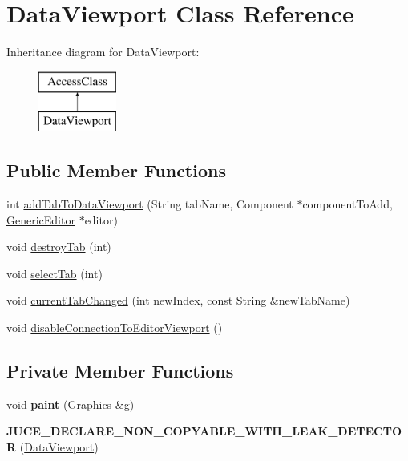 \hypertarget{classDataViewport}{\section{Data\-Viewport Class Reference}
\label{classDataViewport}
}
Inheritance diagram for Data\-Viewport\-:\begin{figure}[H]
\begin{center}
\leavevmode
\includegraphics[height=2.000000cm]{classDataViewport}
\end{center}
\end{figure}
\subsection*{Public Member Functions}
\begin{DoxyCompactItemize}
\item 
int \hyperlink{classDataViewport_accdcf7187ec5864fdbf0c2a3e605b072}{add\-Tab\-To\-Data\-Viewport} (String tab\-Name, Component $\ast$component\-To\-Add, \hyperlink{classGenericEditor}{Generic\-Editor} $\ast$editor)
\item 
void \hyperlink{classDataViewport_ad68668771aa73c3cdcefcfa692fe0098}{destroy\-Tab} (int)
\item 
void \hyperlink{classDataViewport_a03221f79ac5f5edd473221bfc8f42dcc}{select\-Tab} (int)
\item 
void \hyperlink{classDataViewport_a3d468d1c0f59f84165be4b68c0882c8d}{current\-Tab\-Changed} (int new\-Index, const String \&new\-Tab\-Name)
\item 
void \hyperlink{classDataViewport_a6f501d921cd1b2539790624accc6ea00}{disable\-Connection\-To\-Editor\-Viewport} ()
\end{DoxyCompactItemize}
\subsection*{Private Member Functions}
\begin{DoxyCompactItemize}
\item 
\hypertarget{classDataViewport_a0edb05653624ca748aa2fb99be4a92d1}{void {\bfseries paint} (Graphics \&g)}\label{classDataViewport_a0edb05653624ca748aa2fb99be4a92d1}

\item 
\hypertarget{classDataViewport_ade8ef66cda0ef16c1e8bac8acb0bb6f5}{{\bfseries J\-U\-C\-E\-\_\-\-D\-E\-C\-L\-A\-R\-E\-\_\-\-N\-O\-N\-\_\-\-C\-O\-P\-Y\-A\-B\-L\-E\-\_\-\-W\-I\-T\-H\-\_\-\-L\-E\-A\-K\-\_\-\-D\-E\-T\-E\-C\-T\-O\-R} (\hyperlink{classDataViewport}{Data\-Viewport})}\label{classDataViewport_ade8ef66cda0ef16c1e8bac8acb0bb6f5}

\end{DoxyCompactItemize}

